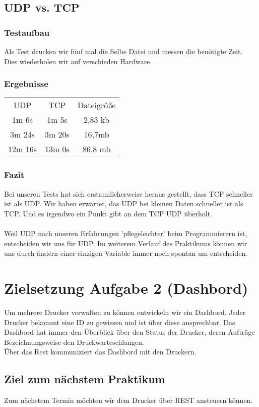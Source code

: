 \documentclass[10pt]{article}
\begin{document}
\subsection{UDP vs. TCP}
\subsubsection{Testaufbau}
Als Test drucken wir fünf mal die Selbe Datei und messen die benötigte Zeit. Dies wiederholen wir auf verschieden Hardware.
\subsubsection{Ergebnisse}
\begin{tabular}{ccc}
 UDP 	 & TCP	  & Dateigröße&\\
 1m 6s   & 1m 5s  & 2,83 kb \\
 3m 24s  & 3m 20s & 16,7mb \\
 12m 16s & 13m 0s & 86,8 mb \\
\end{tabular}
\subsubsection{Fazit}
Bei unseren Tests hat sich erstaunlicherweise heraus gestellt, dass TCP schneller ist als UDP. Wir haben erwartet, das UDP bei kleinen Daten schneller ist als TCP. Und es irgendwo ein Punkt gibt an dem TCP UDP überholt. \\
\\
Weil UDP nach unseren Erfahrungen 'pflegeleichter' beim Programmierern ist, entscheiden wir uns für UDP.
Im weiterem Verlauf des Praktikums können wir uns durch ändern einer einzigen Variable immer noch spontan um entscheiden.

\section{Zielsetzung Aufgabe 2 (Dashbord)}
Um mehrere Drucker verwalten zu können entwickeln wir ein Dashbord. Jeder Drucker bekommt eine ID zu gewissen und ist über diese ansprechbar.
Das Dashbord hat immer den Überblick über den Status der Drucker, deren Aufträge Bezeichnungsweise den Druckwarteschlangen.
\\
Über das Rest kommuniziert das Dashbord mit den Druckern.

%
%

\subsection{Ziel zum nächstem Praktikum}
Zum nächstem Termin möchten wir dem Drucker über REST ansteuern können.
\end{document}
